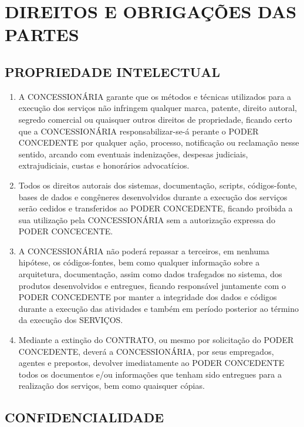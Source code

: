 \documentclass[a4paper,11pt]{report} %
\begin{document}
\chapter{DIREITOS E OBRIGAÇÕES DAS PARTES}
\section{PROPRIEDADE INTELECTUAL}
\label{sec:NSRM}

\begin{enumerate}
\item \label{itm:5BHL} A CONCESSIONÁRIA garante que os métodos e técnicas utilizados para a execução dos serviços não infringem qualquer marca, patente, direito autoral, segredo comercial ou quaisquer outros direitos de propriedade, ficando certo que a CONCESSIONÁRIA responsabilizar-se-á perante o PODER CONCEDENTE por qualquer ação, processo, notificação ou reclamação nesse sentido, arcando com eventuais indenizações, despesas judiciais, extrajudiciais, custas e honorários advocatícios.
\item \label{itm:723E} Todos os direitos autorais dos sistemas, documentação, scripts, códigos-fonte, bases de dados e congêneres desenvolvidos durante a execução dos serviços serão cedidos e transferidos ao PODER CONCEDENTE, ficando proibida a sua utilização pela CONCESSIONÁRIA sem a autorização expressa do PODER CONCECENTE.
\item \label{itm:7BBK} A CONCESSIONÁRIA não poderá repassar a terceiros, em nenhuma hipótese, os códigos-fontes, bem como qualquer informação sobre a arquitetura, documentação, assim como dados trafegados no sistema, dos produtos desenvolvidos e entregues, ficando responsável juntamente com o PODER CONCEDENTE por manter a integridade dos dados e códigos durante a execução das atividades e também em período posterior ao término da execução dos SERVIÇOS.
\item \label{itm:628H} Mediante a extinção do CONTRATO, ou mesmo por solicitação do PODER CONCEDENTE, deverá a CONCESSIONÁRIA, por seus empregados, agentes e prepostos, devolver imediatamente ao PODER CONCEDENTE todos os documentos e/ou informações que tenham sido entregues para a realização dos serviços, bem como quaisquer cópias.
\end{enumerate}

\section{CONFIDENCIALIDADE}
\label{sec:PLXA}
\end{document}
